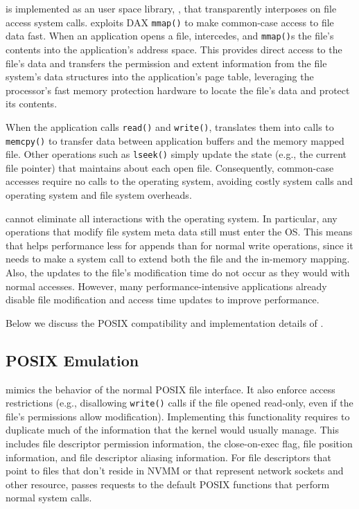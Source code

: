 \DAChell{} is implemented as an user space library, \libd{}, that transparently interposes on file access system calls.
\DAChell{} exploits DAX \texttt{mmap()} to make common-case access to file data
fast.  When an application opens a file, \DAChell{} intercedes, and
\texttt{mmap()}s the file's contents into the application's address space.
This provides direct access to the file's data and transfers the permission and
extent information from the file system's data structures into the
application's page table, leveraging the processor's fast memory
protection hardware to locate the file's data and protect its contents.

When the application calls \texttt{read()} and \texttt{write()}, \DAChell{}
translates them into calls to \texttt{memcpy()} to transfer data between
application buffers and the memory mapped file.  Other operations such as
\texttt{lseek()} simply update the state (e.g., the current file pointer) that
\DAChell{} maintains about each open file.  Consequently, common-case accesses
require no calls to the operating system, avoiding costly system calls and 
operating system and file system overheads.

\DAChell{} cannot eliminate all interactions with the operating system.  In
particular, any operations that modify file system meta data still must enter
the OS.  This means that \DAChell{} helps performance less for appends than for
normal write operations, since it needs to make a system call to extend both
the file and the in-memory mapping.  
Also, the updates to the file's modification time do not occur as they
would with normal accesses.  However, many performance-intensive applications
already disable file modification and access time updates to improve
performance.

Below we discuss the POSIX compatibility and implementation details of
\DAChell{}.

\subsection{POSIX Emulation}

\DAChell{} mimics the behavior of the normal POSIX file
interface. It also
enforce access restrictions (e.g., disallowing \texttt{write()} calls if the
file opened read-only, even if the file's permissions allow modification).
Implementing this functionality requires \DAChell{} to duplicate much of the
information that the kernel would usually manage.  This includes file
descriptor permission information, the close-on-exec flag, file position
information, and file descriptor aliasing information. For file descriptors
that point to files that don't reside in NVMM or that represent
network sockets and other resource, \DAChell{} passes requests to the default
POSIX functions that perform normal system calls.

